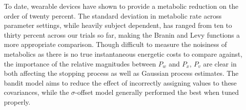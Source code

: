 To date, wearable devices have shown to provide a metabolic reduction on the order of twenty percent. The standard deviation in metabolic rate across parameter settings, while heavily subject dependent, has ranged from ten to thirty percent across our trials so far, making the Branin and Levy functions a more appropriate comparison. Though difficult to measure the noisiness of metabolics as there is no true instantaneous energetic costs to compare against, the importance of the relative magnitudes between $P_w$ and $P_x$, $P_v$ are clear in both affecting the stopping process as well as Gaussian process estimates. The bandit model aims to reduce the effect of incorrectly assigning values to these covariances, while the $\sigma$-offset model generally performed the best when tuned properly.
